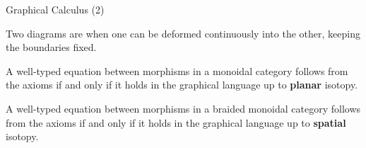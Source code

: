 \documentclass{beamer}
\begin{document}
\begin{frame}{Graphical Calculus (2)}

  \begin{definition}
    Two diagrams are  when one can be deformed continuously into the other, keeping the boundaries fixed.
  \end{definition}

  {
    \begin{theorem}
      A well-typed equation between morphisms in a monoidal category follows from the axioms if and only if it holds in the graphical language up to \textbf{planar} isotopy.
    \end{theorem}
  }

  \begin{theorem}
    A well-typed equation between morphisms in a braided monoidal category follows from the axioms if and only if it holds in the graphical language up to \textbf{spatial} isotopy.
  \end{theorem}


\end{frame}
\end{document}
